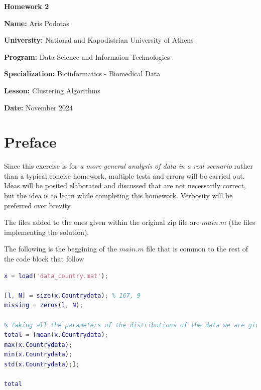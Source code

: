 \documentclass[12pt, a4paper]{article}
\begin{document}
\begin{titlepage}
    \centering
    {\huge \textbf{Homework 2}\par}
    \vspace{0.5cm}
    {\Large \textbf{Name:} Aris Podotas\par}
    \vspace{0.5cm}
    {\large \textbf{University:} National and Kapodistrian University of Athens\par}
    \vspace{0.5cm}
    {\large \textbf{Program:} Data Science and Informaion Technologies\par}
    \vspace{0.5cm}
    {\large \textbf{Specialization:} Bioinformatics - Biomedical Data\par}
    \vspace{0.5cm}
    {\large \textbf{Lesson:} Clustering Algorithms \par}
    \vspace{0.5cm}
    {\large \textbf{Date:} November 2024\par}
    \tableofcontents
\end{titlepage}

\section{Preface}

Since this exercise is for \textit{a more general analysis of data in a real scenario} rather than a typical concise homework, multiple tests and errors will be carried out. Ideas will be posited elaborated and discussed that are not necessarily correct, but the idea is to learn while completing this homework. Verbosity will be preferred over brevity.
\newline

The files added to the ones given within the original zip file are $main.m$ (the files implementing the solution).
\newline

The following is the beggining of the $main.m$ file that is common to the rest of the code block that follow
\begin{lstlisting}[label=lst:common, caption=The common global code in the $main.m$ file., language=Matlab]
x = load('data_country.mat');

[l, N] = size(x.Countrydata); % 167, 9
missing = zeros(l, N);

% Taking all the parameters of the distributions of the data we are given
total = [mean(x.Countrydata);
max(x.Countrydata);
min(x.Countrydata);
std(x.Countrydata);];

total
\end{lstlisting}
\end{document}
